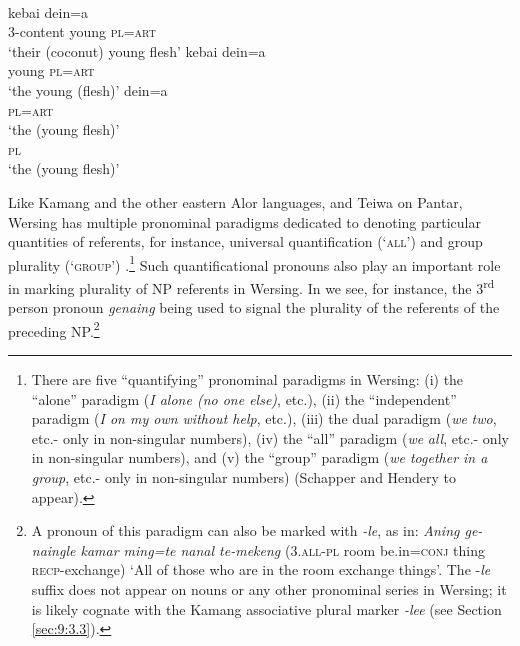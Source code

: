 \ea%
\label{ex:9:57}
 \\
\ea
{}    kebai dein=a\\
3-content young \textsc{pl=art}  \\
\glt `their (coconut) young flesh'
\ex
\gll kebai dein=a   \\
   young \textsc{pl=art}  \\
\glt `the young (flesh)'
\glt
\ex
\gll dein=a   \\
   \textsc{pl=art}  \\
\glt  `the (young flesh)'
\ex
{}\\
    \textsc{pl}\\
\glt  `the (young flesh)'
\z
\z




Like Kamang and the other eastern Alor languages, and Teiwa on Pantar, Wersing has multiple pronominal paradigms dedicated to denoting particular quantities of referents, for instance, universal quantification (`\textsc{all')}  and group plurality (`\textsc{group}') .\footnote{  There are five ``quantifying'' pronominal paradigms in Wersing: (i) the ``alone'' paradigm (\textit{I alone (no one else)}, etc.), (ii) the ``independent'' paradigm (\textit{I on my own without help}, etc.), (iii) the dual paradigm (\textit{we} \textit{two}, etc.- only in non-singular numbers), (iv) the ``all'' paradigm (\textit{we} \textit{all}, etc.- only in non-singular numbers), and (v) the ``group'' paradigm (\textit{we together in a group}, etc.- only in non-singular numbers) (Schapper and Hendery to appear).} Such quantificational pronouns also play an important role in marking plurality of NP referents in Wersing. In  we see, for instance, the 3\textsuperscript{rd} person pronoun \textit{genaing} being
used to signal the plurality of the referents of the preceding NP.\footnote{  A pronoun of this paradigm can also be marked with \textit{-le}, as in: \textit{Aning ge-naingle kamar ming=te nanal te-mekeng} (\textsc{3.all-pl} room be.in=\textsc{conj} thing \textsc{recp}-exchange) `All of those who are in the room exchange things'. The -\textit{le} suffix does not appear on nouns or any other pronominal series in Wersing; it is likely cognate with the Kamang associative plural marker \textit{-lee} (see Section \ref{sec:9:3.3}).}


